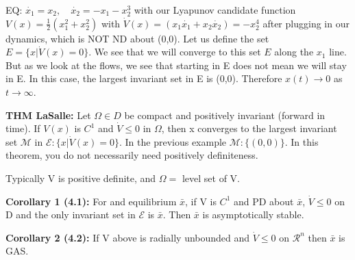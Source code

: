 \documentclass[11pt]{article}
\begin{document}
EQ: $\dot{x_1} = x_2, \quad \dot{x_2} = -x_1 - x_2^3$ with our Lyapunov candidate function $V(x)= \frac{1}{2}(x_1^2 +x_2^2)$ with $\dot{V}(x) = (x_1 \dot{x_1} + x_2 \dot{x_2}) = -x_2^4$ after plugging in our dynamics, which is NOT ND about (0,0). Let us define the set $E=\{ x \rvert \dot{V}(x) = 0 \}$. We see that we will converge to this set $E$ along the $x_1$ line. But as we look at the flows, we see that starting in E does not mean we will stay in E. In this case, the largest invariant set in E is (0,0). Therefore $x(t) \rightarrow 0 $ as $t \rightarrow \infty$.

\textbf{THM LaSalle:} Let $\Omega \in D$ be compact and positively invariant (forward in time). If $V(x)$ is $C^1$ and $\dot{V} \leq 0$ in $\Omega$, then x converges to the largest invariant set $\mathcal{M}$ in $\mathcal{E}:\{ x \rvert \dot{V}(x) =0 \}$. In the previous example $\mathcal{M} : \{ (0,0) \}$. In this theorem, you do not necessarily need positively definiteness. 

Typically V is positive definite, and $\Omega = $ level set of V.

\textbf{Corollary 1 (4.1):} For and equilibrium $\bar{x}$, if V is $C^1$ and PD about $\bar{x}$, $\dot{V}\leq 0$ on D and the only invariant set in $\mathcal{E}$ is $\bar{x}$. Then $\bar{x}$ is asymptotically stable.

\textbf{Corollary 2 (4.2):} If V above is radially unbounded and $\dot{V} \leq 0$ on $\mathcal{R}^n$ then $\bar{x}$ is GAS.


























































\clearpage
% 
\end{document}

